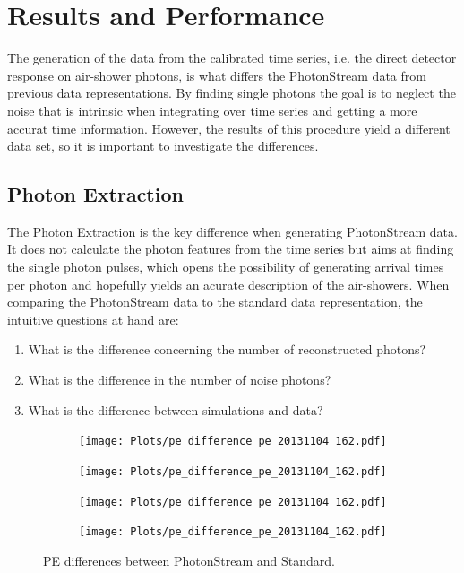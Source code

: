 \chapter{Results and Performance}
%
The generation of the data from the calibrated time series, i.e. the direct
detector response on air-shower photons, is what differs the PhotonStream data
from previous data representations. By finding single photons the goal is to
neglect the noise that is intrinsic when integrating over time series and
getting a more accurat time information. However, the results of this procedure
yield a different data set, so it is important to investigate the differences.

\section{Photon Extraction}
%
The Photon Extraction is the key difference when generating PhotonStream data.
It does not calculate the photon features from the time series but aims at
finding the single photon pulses, which opens the possibility of generating
arrival times per photon and hopefully yields an acurate description of the
air-showers. When comparing the PhotonStream data to the standard data
representation, the intuitive questions at hand are:
%
\begin{enumerate}
  \item What is the difference concerning the number of reconstructed photons?
  \item What is the difference in the number of noise photons?
  \item What is the difference between simulations and data?
\end{enumerate}
%
\begin{figure}
  \begin{subfigure}{\textwidth}
    \centering
    \texttt{[image: Plots/pe\_difference\_pe\_20131104\_162.pdf]}
  \end{subfigure}
  \begin{subfigure}{\textwidth}
    \centering
    \texttt{[image: Plots/pe\_difference\_pe\_20131104\_162.pdf]}
  \end{subfigure}
  \begin{subfigure}{\textwidth}
    \centering
    \texttt{[image: Plots/pe\_difference\_pe\_20131104\_162.pdf]}
  \end{subfigure}
  \begin{subfigure}{\textwidth}
    \centering
    \texttt{[image: Plots/pe\_difference\_pe\_20131104\_162.pdf]}
  \end{subfigure}
  \caption{PE differences between PhotonStream and Standard.}
  \label{fig:difference}
\end{figure}


